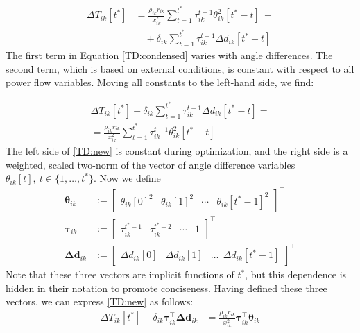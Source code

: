 \documentclass[conference]{IEEEtran}
\begin{document}
\begin{align}
\label{TD:condensed}
\Delta T_{ik}[t^*] &= \frac{\rho_{ik} r_{ik}}{x_{ik}^2}\sum_{t=1}^{t^*}\tau_{ik}^{t-1}\theta_{ik}^2[t^*-t]~ + \\
\nonumber &\quad + \delta_{ik} \sum_{t=1}^{t^*}\tau_{ik}^{t-1}\Delta d_{ik} [t^* - t]
\end{align}
The first term in Equation \eqref{TD:condensed} varies with angle differences. The second term, which is based on external conditions, is constant with respect to all power flow variables. Moving all constants to the left-hand side, we find:

\begin{multline}
\label{TD:new}
\Delta T_{ik}[t^*] - \delta_{ik} \sum_{t=1}^{t^*}\tau_{ik}^{t-1}\Delta d_{ik} [t^* - t]  = \\
 = \frac{\rho_{ik}r_{ik}}{x_{ik}^2} \sum_{t=1}^{t^*} \tau_{ik}^{t-1}\theta_{ik}^2[t^* - t]
\end{multline}
The left side of \eqref{TD:new} is constant during optimization, and the right side is a weighted, scaled two-norm of the vector of angle difference variables $\theta_{ik}[t],~ t\in \{1,\ldots,t^*\}$. Now we define
\begin{align}
\boldsymbol{\theta}_{ik} &:= \begin{bmatrix}\theta_{ik}[0]^2 & \theta_{ik}[1]^2 & \cdots & \theta_{ik}[t^*-1]^2 \end{bmatrix}^\top \\
\boldsymbol{\tau}_{ik} &:= \begin{bmatrix} \tau_{ik}^{t^*-1} & \tau_{ik}^{t^*-2} & \cdots & 1 \end{bmatrix}^\top \\
\boldsymbol{\Delta d}_{ik} &:= \begin{bmatrix}
\Delta d_{ik}[0] & \Delta d_{ik}[1] & \ldots ~~ \Delta d_{ik}[t^*-1] 
\end{bmatrix}^\top
\end{align}
Note that these three vectors are implicit functions of $t^*$, but this dependence is hidden in their notation to promote conciseness. Having defined these three vectors, we can express \eqref{TD:new} as follows:
\begin{align}
\label{TD:vectors}
\Delta T_{ik}[t^*] - \delta_{ik} \boldsymbol{\tau}_{ik}^\top \boldsymbol{\Delta d}_{ik}  &= \frac{\rho_{ik}r_{ik}}{x_{ik}^2} \boldsymbol{\tau}_{ik}^\top \boldsymbol{\theta}_{ik}
\end{align}
\end{document}
